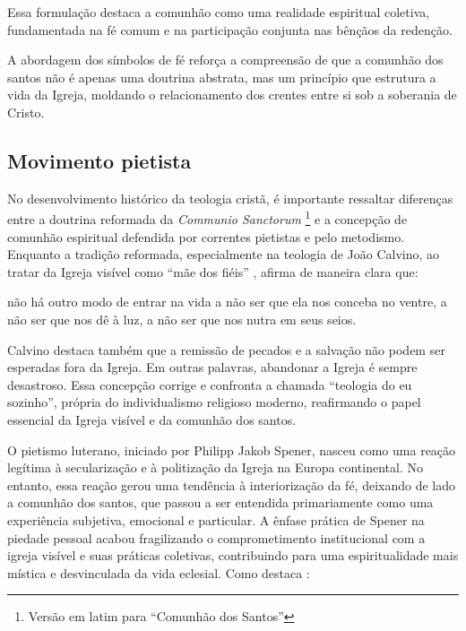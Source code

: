 Essa formulação destaca a comunhão como uma realidade espiritual coletiva, fundamentada na fé comum e na participação conjunta nas bênçãos da redenção.

A abordagem dos símbolos de fé reforça a compreensão de que a comunhão dos santos não é apenas uma doutrina abstrata, mas um princípio que estrutura a vida da Igreja, moldando o relacionamento dos crentes entre si sob a soberania de Cristo.

\subsection{Movimento pietista}

No desenvolvimento histórico da teologia cristã, é importante ressaltar diferenças entre a doutrina reformada da \textit{Communio Sanctorum} \footnote{Versão em latim para ``Comunhão dos Santos''} e a concepção de comunhão espiritual defendida por correntes pietistas e pelo metodismo. Enquanto a tradição reformada, especialmente na teologia de João Calvino, ao tratar da Igreja visível como ``mãe dos fiéis'' \cite[p.~1865]{calvino2022}, afirma de maneira clara que:

\begin{citacao}
    não há outro modo de entrar na vida a não ser que ela nos conceba no ventre, a não ser que nos dê à luz, a não ser que nos nutra em seus seios. \cite[p.~1865]{calvino2022}
\end{citacao}

Calvino destaca também que a remissão de pecados e a salvação não podem ser esperadas fora da Igreja. Em outras palavras, abandonar a Igreja é sempre desastroso. Essa concepção corrige e confronta a chamada ``teologia do eu sozinho'', própria do individualismo religioso moderno, reafirmando o papel essencial da Igreja visível e da comunhão dos santos.

O pietismo luterano, iniciado por Philipp Jakob Spener, nasceu como uma reação legítima à secularização e à politização da Igreja na Europa continental. No entanto, essa reação gerou uma tendência à interiorização da fé, deixando de lado a comunhão dos santos, que passou a ser entendida primariamente como uma experiência subjetiva, emocional e particular. A ênfase prática de Spener na piedade pessoal acabou fragilizando o comprometimento institucional com a igreja visível e suas práticas coletivas, contribuindo para uma espiritualidade mais mística e desvinculada da vida eclesial. Como destaca :

